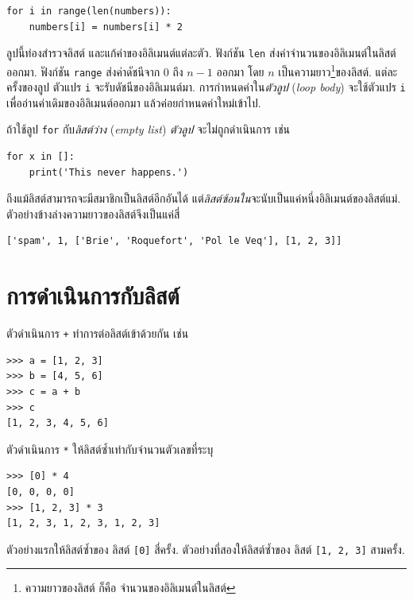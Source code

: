 \begin{verbatim}
for i in range(len(numbers)):
    numbers[i] = numbers[i] * 2
\end{verbatim}
%
ลูปนี้ท่องสำรวจลิสต์ และแก้ค่าของอิลิเมนต์แต่ละตัว.
ฟังก์ชัน \texttt{len} ส่งค่าจำนวนของอิลิเมนต์ในลิสต์ออกมา.
ฟังก์ชัน \texttt{range} ส่งค่าดัชนีจาก $0$ ถึง $n-1$ ออกมา โดย $n$ เป็นความยาว\footnote{
ความยาวของลิสต์ ก็คือ จำนวนของอิลิเมนต์ในลิสต์
}ของลิสต์.
แต่ละครั้งของลูป ตัวแปร \texttt{i} จะรับดัชนีของอิลิเมนต์มา.
การกำหนดค่าใน\textit{ตัวลูป} (\textit{loop body}) จะใช้ตัวแปร \texttt{i} เพื่ออ่านค่าเดิมของอิลิเมนต์ออกมา แล้วค่อยกำหนดค่าใหม่เข้าไป.

ถ้าใช้ลูป \texttt{for} กับ\textit{ลิสต์ว่าง} (\textit{empty list}) \textit{ตัวลูป} จะไม่ถูกดำเนินการ เช่น

\begin{verbatim}
for x in []:
    print('This never happens.')
\end{verbatim}
%
ถึงแม้ลิสต์สามารถจะมีสมาชิกเป็นลิสต์อีกอันได้ แต่\textit{ลิสต์ซ้อนใน}จะนับเป็นแค่หนึ่งอิลิเมนต์ของลิสต์แม่. ตัวอย่างข้างล่างความยาวของลิสต์จึงเป็นแค่สี่

\begin{verbatim}
['spam', 1, ['Brie', 'Roquefort', 'Pol le Veq'], [1, 2, 3]]
\end{verbatim}

\section{การดำเนินการกับลิสต์}

ตัวดำเนินการ \texttt{+} ทำการต่อลิสต์เข้าด้วยกัน เช่น

\begin{verbatim}
>>> a = [1, 2, 3]
>>> b = [4, 5, 6]
>>> c = a + b
>>> c
[1, 2, 3, 4, 5, 6]
\end{verbatim}
%
ตัวดำเนินการ \texttt{*} ให้ลิสต์ซ้ำเท่ากับจำนวนตัวเลขที่ระบุ

\begin{verbatim}
>>> [0] * 4
[0, 0, 0, 0]
>>> [1, 2, 3] * 3
[1, 2, 3, 1, 2, 3, 1, 2, 3]
\end{verbatim}
%
ตัวอย่างแรกให้ลิสต์ซ้ำของ ลิสต์ \texttt{[0]} สี่ครั้ง.  
ตัวอย่างที่สองให้ลิสต์ซ้ำของ ลิสต์ \texttt{[1, 2, 3]} สามครั้ง.


